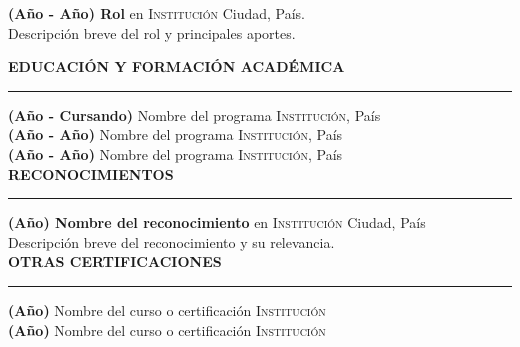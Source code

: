 \documentclass[10pt,a4paper]{article}
\begin{document}
\vspace{0.2cm}
\textbf{(Año - Año) Rol} en \textsc{Institución} \hfill Ciudad, País.\\
Descripción breve del rol y principales aportes.


\vspace{0.2cm}
\textbf{EDUCACIÓN Y FORMACIÓN ACADÉMICA}\vspace{-0.25cm}\\
\noindent\rule{\textwidth}{2pt}

\textbf{(Año - Cursando)} Nombre del programa \hfill \textsc{Institución,} País\\
\textbf{(Año - Año)} Nombre del programa \hfill \textsc{Institución,} País\\
\textbf{(Año - Año)} Nombre del programa \hfill \textsc{Institución,} País\\

\vspace{0.2cm}
\textbf{RECONOCIMIENTOS}\vspace{-0.25cm}

\noindent\rule{\textwidth}{1pt}
\textbf{(Año) Nombre del reconocimiento} en \textsc{Institución} \hfill Ciudad, País\\
Descripción breve del reconocimiento y su relevancia.\\

\vspace{0.2cm}
\textbf{OTRAS CERTIFICACIONES}\vspace{-0.25cm}

\noindent\rule{\textwidth}{1pt}
\textbf{(Año)} Nombre del curso o certificación \hfill \textsc{Institución}\\
\textbf{(Año)} Nombre del curso o certificación \hfill \textsc{Institución}\\
\end{document}
